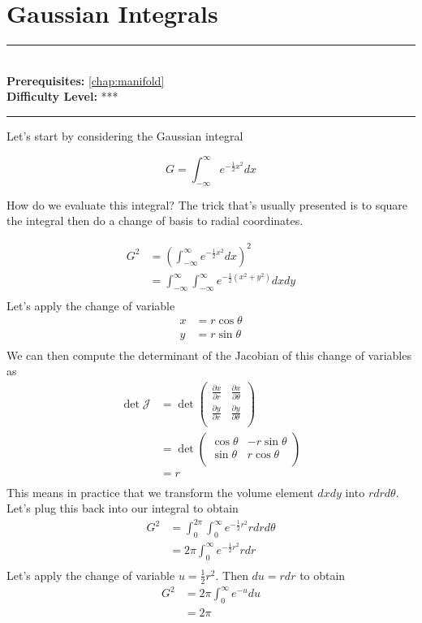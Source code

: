 \documentclass[book.tex]{subfiles}
\begin{document}
\chapter{Gaussian Integrals}
\label{chap:gaussian_integrals}
\noindent\rule{11cm}{0.4pt} \\
\textbf{Prerequisites:} \autoref{chap:manifold} \\
\textbf{Difficulty Level:} *** \\
\noindent\rule{11cm}{0.4pt}
\vspace{5mm}


Let's start by considering the Gaussian integral

\[ G = \int_{-\infty}^\infty e^{-\frac{1}{2}x^2} dx \]

How do we evaluate this integral? The trick that's usually presented is to square the integral then do a change of basis to radial coordinates.

\begin{align}
    G^2 &= \left ( \int_{-\infty}^\infty e^{-\frac{1}{2}x^2} dx \right )^2 \\
    &= \int_{-\infty}^\infty \int_{-\infty}^\infty e^{-\frac{1}{2}(x^2 + y^2)} dx dy \\
\end{align}
Let's apply the change of variable 
\begin{align}
    x &= r \cos \theta \\
    y &= r \sin \theta \\
\end{align}
We can then compute the determinant of the Jacobian of this change of variables as 
\begin{align}
\det \mathcal{J} &= \det \begin{pmatrix}
    \frac{\partial x}{\partial r} & \frac{\partial x}{\partial \theta} \\
    \frac{\partial y}{\partial r} & \frac{\partial y}{\partial \theta} \\
    \end{pmatrix} \\
    &= \det \begin{pmatrix}
    \cos\theta & -r\sin \theta \\
    \sin \theta & r \cos \theta \\
\end{pmatrix} \\
&= r \\
\end{align}
This means in practice that we transform the volume element $dx dy$ into $r dr d\theta$. Let's plug this back into our integral to obtain
\begin{align}
    G^2 &= \int_{0}^{2\pi} \int_{0}^\infty e^{-\frac{1}{2}r^2} r dr d\theta\\
    &= 2 \pi \int_{0}^\infty e^{-\frac{1}{2}r^2} r dr \\
\end{align}
Let's apply the change of variable $u = \frac{1}{2}r^2$. Then $du = r dr$ to obtain
\begin{align}
    G^2 &= 2 \pi \int_0^\infty e^{-u} du \\
    &= 2 \pi
\end{align}
\end{document}
